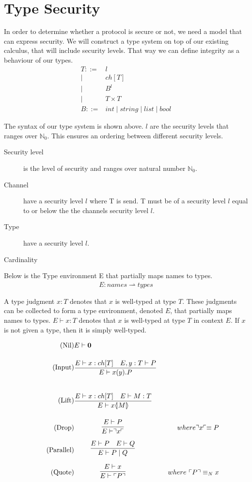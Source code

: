 \section{Type Security}
In order to determine whether a protocol is secure or not, we need a model that can express security.
We will construct a type system on top of our existing calculus, that will include security levels.
That way we can define integrity as a behaviour of our types.
\begin{align*}
	T::=&l \tag{Security Level}\\
	\mid& ch[T] \tag{Channel}\\
	\mid& B^l \tag{Type}\\
	\mid& T \times T \tag{Cardinality}\\
	B::=&int 
	\mid string 
	\mid list 
	\mid bool 
\end{align*}

\noindent The syntax of our type system is shown above.
$l$ are the security levels that ranges over $\mathbb{N}_0$.
This ensures an ordering between different security levels.

\begin{description}
\item[Security level] is the level of security and ranges over natural number $\mathbb{N}_0$.
\item[Channel] have a security level $l$ where T is send. T must be of a security level $l$ equal to or below the the channels security level $l$.
\item[Type] have a security level $l$.
\item[Cardinality] 
\end{description}

Below is the Type environment E that partially maps names to types.
\begin{align*}
E: names \rightharpoonup types
\end{align*}

\noindent A type judgment $x:T$ denotes that $x$ is well-typed at type $T$.
These judgments can be collected to form a type environment, denoted $E$, that partially maps names to types.
$E\vdash x:T$ denotes that $x$ is well-typed at type $T$ in context $E$.
If $x$ is not given a type, then it is simply well-typed.


\begin{align}
\tag{Nil} &E \vdash \nil\\
\tag{Input} &\infrule{E\vdash x:ch[T]\quad E,y:T\vdash P}{E \vdash \inp{x}{y}P}\\
\tag{Lift} &\infrule{E\vdash x:ch[T]\quad E \vdash M:T}{E\vdash \lift{x}{M}}\\
\tag{Drop} &\infrule{E \vdash P}{E\vdash \drop{x}}& where \drop{x} \equiv P\\
\tag{Parallel} &\infrule{E\vdash P \quad E \vdash Q}{E \vdash P \para Q}\\
\tag{Quote} &\infrule{E \vdash x}{E\vdash \quot{P}}& where\ \quot{P} \equiv_N x
\end{align}

